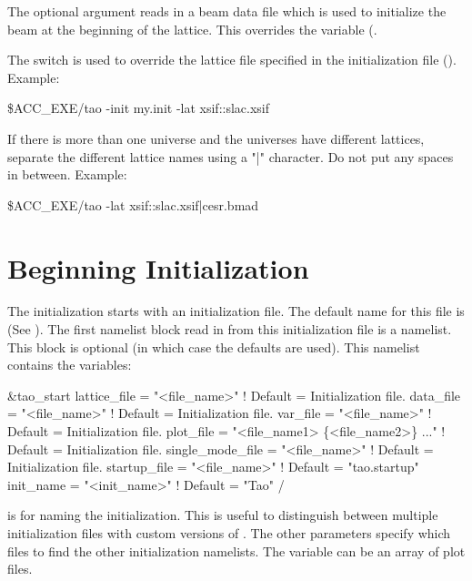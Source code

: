The  optional argument reads in a beam data file which is
used to initialize the beam at the beginning of the lattice. This
overrides the  variable (.

The  switch is used to override the 
lattice file specified in the initialization file
(). Example:
\begin{example}
  \$ACC_EXE/tao -init my.init -lat xsif::slac.xsif
\end{example}
If there is more than one universe and the universes have different
lattices, separate the different lattice names using a "|" character.
Do not put any spaces in between. Example:
\begin{example}
  \$ACC_EXE/tao -lat xsif::slac.xsif|cesr.bmad
\end{example}

\section{Beginning Initialization}
\label{s:init.global} 

The initialization starts with an initialization file. The default name for
this file is  (See ).
The first namelist block read in from this initialization file is a 
 namelist. This block is optional (in which case the defaults
are used).  This namelist contains the variables:
\begin{example}
  &tao_start
    lattice_file      = "<file_name>"  ! Default = Initialization file.
    data_file         = "<file_name>"  ! Default = Initialization file.
    var_file          = "<file_name>"  ! Default = Initialization file.
    plot_file         = "<file_name1> \{<file_name2>\} ..."  ! Default = Initialization file.
    single_mode_file  = "<file_name>"  ! Default = Initialization file.
    startup_file      = "<file_name>"  ! Default = "tao.startup"
    init_name         = "<init_name>"  ! Default = "Tao"
  /
\end{example}
 is for naming the initialization. This is useful to
distinguish between multiple initialization files with custom versions
of \tao. The other parameters specify which files to find the other
initialization namelists. The  variable can be an array
of plot files. 

